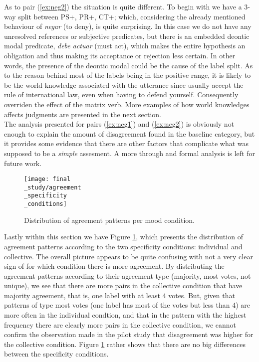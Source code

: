 As to pair (\ref{ex:neg2}) the situation is quite different. To begin with we have a 3-way split between PS+, PR+, CT+; which, considering the already mentioned behaviour of \textit{negar} (to deny), is quite surprising. In this case we do not have any unresolved references or subjective predicates, but there is an embedded deontic modal predicate, \textit{debe actuar} (must act), which makes the entire hypothesis an obligation \citep{morante2012modality} and thus making its acceptance or rejection less certain. In other words, the presence of the deontic modal could be the cause of the label split. As to the reason behind most of the labels being in the positive range, it is likely to be the world knowledge associated with the utterance since usually accept the rule of international law, even when having to defend yourself. Consequently overriden the effect of the matrix verb. More examples of how world knowledges affects judgments are presented in the next section.\\

The analysis presented for pairs (\ref{ex:neg1}) and (\ref{ex:neg2}) is obviously not enough to explain the amount of disagreement found in the baseline category, but it provides some evidence that there are other factors that complicate what was supposed to be a \textit{simple} assesment. A more through and formal analysis is left for future work.\\

\begin{figure}
\parbox{15cm}{\texttt{[image: final\\\_study/agreement\\\_specificity\\\_conditions]}
\caption{Distribution of agreement patterns per mood condition.}\label{fig:specpat}}
\qquad
\end{figure}

Lastly within this section we have Figure \ref{fig:specpat}, which presents the distribution of agreement patterns according to the two specificity conditions: individual and collective. The overall picture appears to be quite confusing with not a very clear sign of for which condition there is more agreement. By distributing the agreement patterns according to their agreement type (majority, most votes, not unique), we see that there are more pairs in the collective condition that have majority agreement, that is, one label with at least 4 votes. But, given that patterns of type most votes (one label has most of the votes but less than 4) are more often in the individual condtion, and that in the pattern with the highest frequency there are clearly more pairs in the collective condition, we cannot confirm the observation made in the pilot study that disagreement was higher for the collective condition. Figure \ref{fig:specpat} rather shows that there are no big differences between the specificity conditions.\\

